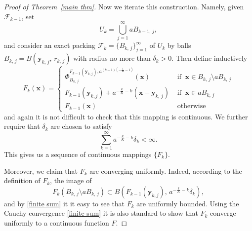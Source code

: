 \documentclass[reqno,11pt]{amsart}
\def\ez{\epsilon}
\def\epsilon{\varepsilon}
\numberwithin{equation}{section}
\theoremstyle{remark}
\begin{document}
\begin{proof}[Proof of Theorem~\ref{main thm}]
Now we iterate this construction. Namely, given $\mathcal F_{k-1}$,   set 
$$U_k=\bigcup_{j=1}^\infty aB_{k-1,\,j},$$
and consider an exact packing $\mathcal F_k=\{B_{k,\,j}\}_{j=1}^\infty$ of
$U_k$ by balls $B_{k,\,j}=B(\mathbf {y}_{k,\,j},\,r_{k,\,j})$ with radius no more than $\delta_k>0$. Then define inductively
$$
F_k(\mathbf {x}) = \left\{ \begin{array}{ll}
\Phi^{F_{k-1}(\mathbf{y}_{k,j}),a^{(k-1)\left(-\frac{1}{K}-1\right)}}_{B_{k,\,j}}(\mathbf {x}) & \textrm{ if } \ \mathbf x\in B_{k,\,j}\setminus a B_{k,\,j}\\
F_{k-1}(\mathbf{y}_{k,j})+a^{-\frac {k} K-k}(\mathbf x-\mathbf {y}_{k,\,j})   & \textrm{ if } \  \mathbf x\in aB_{k,\,j}\\
F_{k-1}(\mathbf x) & \textrm{ otherwise }
\end{array} \right. $$
and again it is not difficult to check that this mapping is continuous. 
We further require that $\delta_k$ are chosen to satisfy
\begin{equation}\label{finite sum}
    \sum_{k=1}^\infty a^{-\frac k K-k} \delta_k<\infty. 
\end{equation}
This gives us a sequence of continuous mappings  $\{F_k\}$.


Moreover,  we claim that $F_k$ are converging uniformly. Indeed, according to the definition of $F_k$, the image of 
\begin{equation}\label{image}
F_k(B_{k,\,j}\setminus a B_{k,\,j})\subset  B(F_{k-1}(\mathbf{y}_{k,j}),\,a^{-\frac k K-k}\delta_k),
\end{equation}
and by \eqref{finite sum} it it easy to see that $F_k$ are uniformly bounded. Using the  Cauchy convergence \eqref{finite sum} it is also standard to show that $F_k$ converge uniformly to a continuous function $F$. 



\end{proof}
\end{document}
